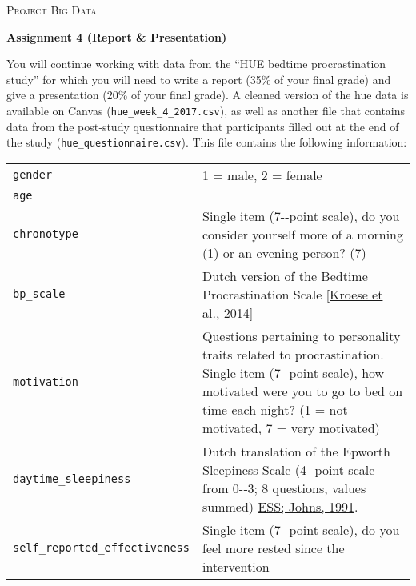 \documentclass[a4paper]{report}
\theoremstyle{definition}
\newcommand{\blankline}{\par\vspace{5mm}}
\begin{document}
	
	\begin{center}
		\textsc{\Large Project Big Data}
		\blankline
		
		\textbf{\large Assignment 4 (Report \& Presentation)}
	\end{center}
	
	You will continue working with data from the ``HUE bedtime procrastination study'' for which you will need to write a report (35\% of your final grade) and give a presentation (20\% of your final grade). A cleaned version of the hue data is available on Canvas (\texttt{\small hue\_week\_4\_2017.csv}), as well as another file that contains data from the post‐study questionnaire that participants filled
	out at the end of the study (\texttt{\small hue\_questionnaire.csv}). This file contains the following information:
	
	\blankline
	
	\begin{tabular}{| l | p{} |}
		\hline
		\texttt{gender} 						& 1 = male, 2 = female \\
		\texttt{age}							& \\
		
		\texttt{chronotype}						& Single item (7-­‐point scale), do you consider yourself more of a morning (1) or an evening person? (7) \\
		
		\texttt{bp\_scale}						& Dutch version of the Bedtime Procrastination Scale \href{http://selfregulationlab.nl/wp-content/uploads/2012/04/J-Health-Psychol-2016-Kroese-853-62.pdf}{[Kroese et al., 2014]} \\
		
		\texttt{motivation} 					& Questions pertaining to personality traits related to procrastination. Single item (7-­‐point scale), how motivated were you to go to bed on time each night? (1 = not motivated, 7 = very motivated) \\
		
		\texttt{daytime\_sleepiness}			& Dutch translation of the Epworth Sleepiness Scale (4-­‐point scale from 0-­‐3; 8 questions, values summed) 	\href{http://www.mwjohns.com/wp-content/uploads/2009/murray\_papers/a\_new\_method\_for\_measure\_daytime\_sleepiness\_the\_epworth\_sleepiness\_scale.pdf}{ESS; Johns, 1991}. \\
		
		\texttt{self\_reported\_effectiveness}  & Single item (7-­‐point scale), do you feel more rested since the intervention \\
		\hline
	\end{tabular}
	
\end{document}
